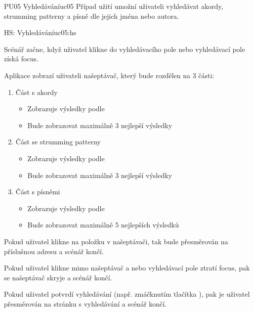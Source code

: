 \begin{usecase}{PU05 Vyhledávání}{uc05}
    Případ užití umožní uživateli vyhledávat akordy, strumming patterny a písně dle jejich jména nebo autora.

    \begin{scenario}{HS: Vyhledávání}{uc05:hs}
        \item Scénář začne, když uživatel klikne do vyhledávacího pole nebo vyhledávací pole získá focus.
        \item Aplikace zobrazí uživateli našeptávač, který bude rozdělen na 3 části:
        \begin{enumerate}
            \item Část s akordy
                  \begin{itemize}
                      \item Zobrazuje výsledky podle 
                      \item Bude zobrazovat maximálně 3 nejlepší výsledky
                  \end{itemize}
            \item Část se strumming patterny
                  \begin{itemize}
                      \item Zobrazuje výsledky podle 
                      \item Bude zobrazovat maximálně 3 nejlepší výsledky
                  \end{itemize}
            \item Část s písněmi
                  \begin{itemize}
                      \item Zobrazuje výsledky podle 
                      \item Bude zobrazovat maximálně 5 nejlepších výsledků
                  \end{itemize}
        \end{enumerate}
        \item Pokud uživatel klikne na položku v našeptávači, tak bude přesměrován na příslušnou adresu a scénář končí.
        \item Pokud uživatel klikne mimo našeptávač a nebo vyhledávací pole ztratí focus, pak se našeptávač skryje a scénář končí.
        \item Pokud uživatel potvrdí vyhledávání (např. zmáčknutím tlačítka ), pak je uživatel přesměrován na stránku s vyhledávání a scénář končí.
    \end{scenario}


\end{usecase}
